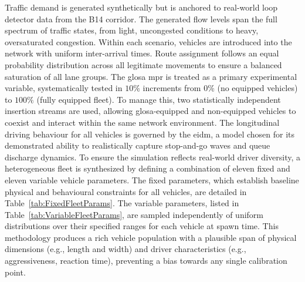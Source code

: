 Traffic demand is generated synthetically but is anchored to real-world loop detector data from the B14 corridor. The generated flow levels span the full spectrum of traffic states, from light, uncongested conditions to heavy, oversaturated congestion. Within each scenario, vehicles are introduced into the network with uniform inter-arrival times. Route assignment follows an equal probability distribution across all legitimate movements to ensure a balanced saturation of all lane groups. The \ac{glosa} \ac{mpr} is treated as a primary experimental variable, systematically tested in $10\%$ increments from $0\%$ (no equipped vehicles) to $100\%$ (fully equipped fleet). To manage this, two statistically independent insertion streams are used, allowing \ac{glosa}-equipped and non-equipped vehicles to coexist and interact within the same network environment.
\mynewline
The longitudinal driving behaviour for all vehicles is governed by the \ac{eidm}, a model chosen for its demonstrated ability to realistically capture stop-and-go waves and queue discharge dynamics. To ensure the simulation reflects real-world driver diversity, a heterogeneous fleet is synthesized by defining a combination of eleven fixed and eleven variable vehicle parameters. The fixed parameters, which establish baseline physical and behavioural constraints for all vehicles, are detailed in Table~\vref{tab:FixedFleetParams}. The variable parameters, listed in Table~\vref{tab:VariableFleetParams}, are sampled independently of uniform distributions over their specified ranges for each vehicle at spawn time. This methodology produces a rich vehicle population with a plausible span of physical dimensions (e.g., length and width) and driver characteristics (e.g., aggressiveness, reaction time), preventing a bias towards any single calibration point.
\mynewline

